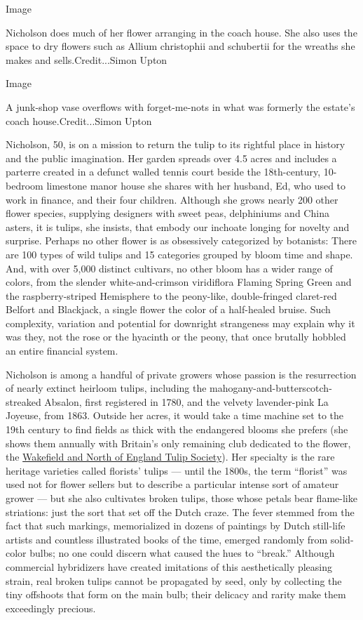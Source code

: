 Image

Nicholson does much of her flower arranging in the coach house. She also
uses the space to dry flowers such as Allium christophii and schubertii
for the wreaths she makes and sells.Credit...Simon Upton

Image

A junk-shop vase overflows with forget-me-nots in what was formerly the
estate's coach house.Credit...Simon Upton

Nicholson, 50, is on a mission to return the tulip to its rightful place
in history and the public imagination. Her garden spreads over 4.5 acres
and includes a parterre created in a defunct walled tennis court beside
the 18th-century, 10-bedroom limestone manor house she shares with her
husband, Ed, who used to work in finance, and their four children.
Although she grows nearly 200 other flower species, supplying designers
with sweet peas, delphiniums and China asters, it is tulips, she
insists, that embody our inchoate longing for novelty and surprise.
Perhaps no other flower is as obsessively categorized by botanists:
There are 100 types of wild tulips and 15 categories grouped by bloom
time and shape. And, with over 5,000 distinct cultivars, no other bloom
has a wider range of colors, from the slender white-and-crimson
viridiflora Flaming Spring Green and the raspberry-striped Hemisphere to
the peony-like, double-fringed claret-red Belfort and Blackjack, a
single flower the color of a half-healed bruise. Such complexity,
variation and potential for downright strangeness may explain why it was
they, not the rose or the hyacinth or the peony, that once brutally
hobbled an entire financial system.

Nicholson is among a handful of private growers whose passion is the
resurrection of nearly extinct heirloom tulips, including the
mahogany-and-butterscotch-streaked Absalon, first registered in 1780,
and the velvety lavender-pink La Joyeuse, from 1863. Outside her acres,
it would take a time machine set to the 19th century to find fields as
thick with the endangered blooms she prefers (she shows them annually
with Britain's only remaining club dedicated to the flower, the
\href{https://www.tulipsociety.co.uk/}{Wakefield and North of England
Tulip Society}). Her specialty is the rare heritage varieties called
florists' tulips --- until the 1800s, the term ``florist'' was used not
for flower sellers but to describe a particular intense sort of amateur
grower --- but she also cultivates broken tulips, those whose petals
bear flame-like striations: just the sort that set off the Dutch craze.
The fever stemmed from the fact that such markings, memorialized in
dozens of paintings by Dutch still-life artists and countless
illustrated books of the time, emerged randomly from solid-color bulbs;
no one could discern what caused the hues to ``break.'' Although
commercial hybridizers have created imitations of this aesthetically
pleasing strain, real broken tulips cannot be propagated by seed, only
by collecting the tiny offshoots that form on the main bulb; their
delicacy and rarity make them exceedingly precious.

